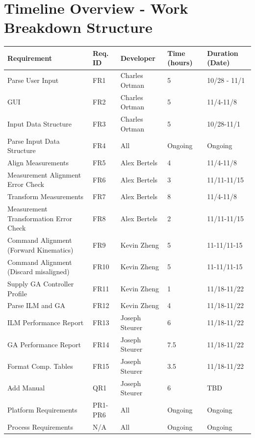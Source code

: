 \documentclass[pdftex,10pt,a4paper]{article}
\begin{document}
\section*{Timeline Overview - Work Breakdown Structure}
\begin{center}
\begin{adjustwidth}{-1cm}{}
\begin{tabular}{ | l | l | l | l | l |}
\hline
{\bf Requirement} & {\bf Req. ID} & {\bf Developer} & {\bf Time (hours)} & {\bf Duration (Date)} \\ \hline
Parse User Input & FR1 & Charles Ortman & 5 & 10/28 - 11/1 \\ \hline
GUI & FR2 & Charles Ortman & 5 & 11/4-11/8 \\ \hline
Input Data Structure & FR3 & Charles Ortman & 5 & 10/28-11/1 \\ \hline
Parse Input Data Structure & FR4 & All & Ongoing & Ongoing \\ \hline
Align Measurements & FR5 & Alex Bertels & 4 & 11/4-11/8 \\ \hline
Measurement Alignment Error Check & FR6 & Alex Bertels & 3 & 11/11-11/15 \\ \hline
Transform Measurements & FR7 & Alex Bertels & 8 & 11/4-11/8 \\ \hline
Measurement Transformation Error Check & FR8 & Alex Bertels & 2 & 11/11-11/15 \\ \hline
Command Alignment (Forward Kinematics) & FR9 & Kevin Zheng & 5 & 11-11/11-15 \\ \hline
Command Alignment (Discard misaligned) & FR10 & Kevin Zheng & 5 & 11-11/11-15 \\ \hline
Supply GA Controller Profile & FR11 & Kevin Zheng & 1 & 11/18-11/22 \\ \hline
Parse ILM and GA & FR12 & Kevin Zheng & 4 & 11/18-11/22 \\ \hline
ILM Performance Report & FR13 & Joseph Steurer & 6 & 11/18-11/22 \\ \hline
GA Performance Report & FR14 & Joseph Steurer & 7.5 & 11/18-11/22 \\ \hline
Format Comp. Tables & FR15 & Joseph Steurer & 3.5 & 11/18-11/22 \\ \hline
Add Manual & QR1 & Joseph Steurer & 6 & TBD\\ \hline
Platform Requirements & PR1-PR6 & All & Ongoing & Ongoing\\ \hline
Process Requirements & N/A & All & Ongoing & Ongoing\\ \hline
\end{tabular}
\end{adjustwidth}
\end{center}
\end{document}
